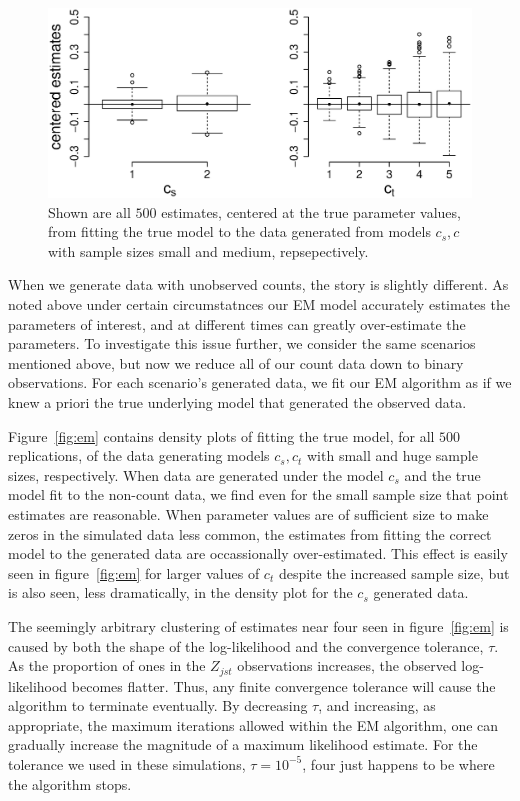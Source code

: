 \begin{figure}
  \centering
  \includegraphics[scale=0.5]{bp}
  \caption{Shown are all $500$ estimates, centered at the true parameter values, from fitting the true model to the data generated from models $c_s,c$ with sample sizes small and medium, repsepectively.}
  \label{fig:bp}
\end{figure}

When we generate data with unobserved counts, the story is slightly different.  As noted above under certain circumstatnces our EM model accurately estimates the parameters of interest, and at different times can greatly over-estimate the parameters.  To investigate this issue further, we consider the same scenarios mentioned above, but now we reduce all of our count data down to binary observations.  For each scenario's generated data, we fit our EM algorithm as if we knew a priori the true underlying model that generated the observed data.

Figure~\ref{fig:em} contains density plots of fitting the true model, for all $500$ replications, of the data generating models $c_s,c_t$ with small and huge sample sizes, respectively.  When data are generated under the model $c_s$ and the true model fit to the non-count data, we find even for the small sample size that point estimates are reasonable.  When parameter values are of sufficient size to make zeros in the simulated data less common, the estimates from fitting the correct model to the generated data are occassionally over-estimated.  This effect is easily seen in figure~\ref{fig:em} for larger values of $c_t$ despite the increased sample size, but is also seen, less dramatically, in the density plot for the $c_s$ generated data.  

The seemingly arbitrary clustering of estimates near four seen in figure~\ref{fig:em} is caused by both the shape of the log-likelihood and the convergence tolerance, $\tau$.  As the proportion of ones in the $Z_{jst}$ observations increases, the observed log-likelihood becomes flatter.  Thus, any finite convergence tolerance will cause the algorithm to terminate eventually.  By decreasing $\tau$, and increasing, as appropriate, the maximum iterations allowed within the EM algorithm, one can gradually increase the magnitude of a maximum likelihood estimate.  For the tolerance we used in these simulations, $\tau = 10^{-5}$, four just happens to be where the algorithm stops.

